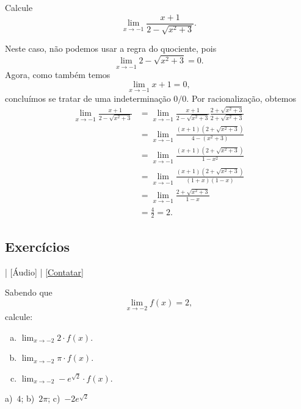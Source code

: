 \begin{exeresol}
  Calcule
  \begin{equation}
    \lim_{x\to -1} \frac{x+1}{2-\sqrt{x^2+3}}.
  \end{equation}
\end{exeresol}
\begin{resol}
  Neste caso, não podemos usar a regra do quociente, pois
  \begin{equation}
    \lim_{x\to -1} 2-\sqrt{x^2+3} = 0.
  \end{equation}
  Agora, como também temos
  \begin{equation}
    \lim_{x\to -1} x+1 = 0,
  \end{equation}
  concluímos se tratar de uma indeterminação $0/0$. Por racionalização, obtemos
  \begin{align}
    \lim_{x\to -1} \frac{x+1}{2-\sqrt{x^2+3}} &= \lim_{x\to -1} \frac{x+1}{2-\sqrt{x^2+3}}\frac{2+\sqrt{x^2+3}}{2+\sqrt{x^2+3}} \\
                                              &= \lim_{x\to -1} \frac{(x+1)(2+\sqrt{x^2+3})}{4 - (x^2+3)}\\
                                              &= \lim_{x\to -1} \frac{(x+1)(2+\sqrt{x^2+3})}{1-x^2}\\
                                              &= \lim_{x\to -1} \frac{(x+1)(2+\sqrt{x^2+3})}{(1+x)(1-x)}\\
                                              &= \lim_{x\to -1} \frac{2+\sqrt{x^2+3}}{1-x} \\
                                              &= \frac{4}{2} = 2.
  \end{align}
\end{resol}

\subsection*{Exercícios}

\begin{flushright}
  [Vídeo] | [Áudio] | \href{https://phkonzen.github.io/notas/contato.html}{[Contatar]}
\end{flushright}

\begin{exer}
  Sabendo que
  \begin{equation}
    \lim_{x\to -2} f(x) = 2,
  \end{equation}
  calcule:
  \begin{enumerate}[a)]
  \item $\displaystyle \lim_{x\to -2} 2\cdot f(x)$.
  \item $\displaystyle \lim_{x\to -2} \pi\cdot f(x)$.
  \item $\displaystyle \lim_{x\to -2} -e^{\sqrt{2}}\cdot f(x)$.
  \end{enumerate}
\end{exer}
\begin{resp}
  a)~$4$; b)~$2\pi$; c)~$-2e^{\sqrt{2}}$
\end{resp}


